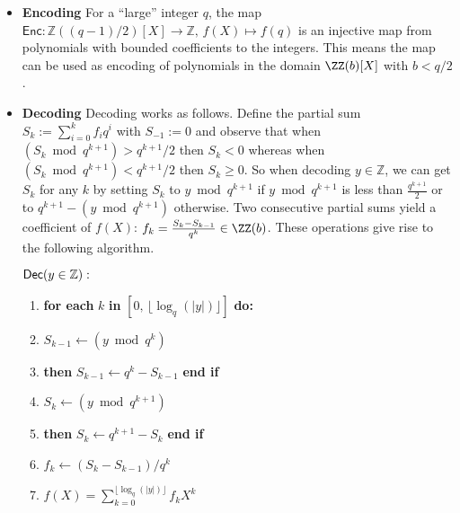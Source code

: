 \begin{itemize}
    \item \textbf{Encoding}
For a ``large'' integer $q$, the map $\mathsf{Enc} : \mathbb{Z}((q-1)/2)[X] \rightarrow \mathbb{Z}, \, f(X) \mapsto f(q)$ is an injective map from polynomials with bounded coefficients to the integers. This means the map can be used as encoding of polynomials in the domain $\ZZ(b)[X]$ with $b<q/2$.
    \item \textbf{Decoding}
Decoding works as follows. Define the partial sum $S_k := \sum_{i=0}^k f_i q^i$ with $S_{-1} := 0$ and observe that when $(S_k \bmod q^{k+1}) > q^{k+1}/2$ then $S_k < 0$ whereas when $(S_k \bmod q^{k+1}) < q^{k+1}/2$ then $S_k \geq 0$. 
So when decoding $y \in \mathbb{Z}$, we can get $S_k$ for any $k$ by setting $S_k$ to $y \bmod q^{k+1}$ if $y \bmod q^{k+1}$ is less than $\frac{q^{k+1}}{2}$ or to $q^{k+1}- (y \bmod q^{k+1})$ otherwise.
Two consecutive partial sums yield a coefficient of $f(X)$: $f_k = \frac{S_{k} - S_{k-1}}{q^{k}} \in \ZZ(b)$. These operations give rise to the following algorithm.\\
\begin{minipage}{0.9\textwidth}
\begin{mdframed}
\begin{flushleft}
	$\textsf{{Dec}}(y \in \mathbb{Z}):$
	\begin{enumerate}[nolistsep]
	    \item \textbf{for each} $k$ \textbf{in} $[0, \, \lfloor \log_q(|y|)\rfloor]$ \textbf{do:}\\
		\item \pcind[1] $S_{k-1} \gets (y \bmod q^{k})$
		\item \pcind[1]  \textbf{then} $S_{k-1} \gets q^{k}-S_{k-1}$ \textbf{end if}
		\item \pcind[1] $S_k \gets (y \bmod q^{k+1})$
		\item \pcind[1]  \textbf{then} $S_{k} \gets q^{k+1}-S_{k}$ \textbf{end if}
		\item \pcind[1] $f_k \gets (S_{k} - S_{k-1}) / q^k$
		\item \pcreturn $f(X) = \sum_{k=0}^{\lfloor \log_q(|y|)\rfloor} f_k X^k$
	\end{enumerate} 
\end{flushleft}
\end{mdframed}
\end{minipage}
\end{itemize}
	
